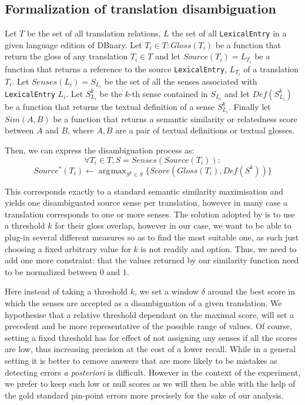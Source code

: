 \documentclass[10pt,a4paper,twoside]{article}
\DeclareMathOperator*{\argmax}{arg\!\max}
\begin{document}
\subsection{Formalization of translation disambiguation}
Let \(T\) be the set of all translation relations, \(L\) the set of all \verb|LexicalEntry| in a given language edition of DBnary. Let \(T_i\in T: Gloss(T_i)\) be a function that return the gloss of any translation \(T_i\in T\) and let \(Source(T_i)=L_{T_i}\) be a function that returns a reference to the source \verb|LexicalEntry|, \(L_{T_i}\) of a translation \(T_i\). Let \(Senses(L_i)=S_{L_i}\) be the set of all the senses associated with \verb|LexicalEntry| \(L_i\). Let \(S_{L_i}^k\) be the \(k\)-th sense contained in \(S_{L_i}\) and let \(Def(S_{L_i}^k)\) be a function that returns the textual definition of a sense \(S_{L_i}^k\). Finally let \(Sim(A,B)\) be a function that returns a semantic similarity or relatedness score between \(A\) and \(B\), where \(A,B\) are a pair of textual definitions or textual glosses. 

Then, we can express the disambiguation process as:
\[
\forall T_i \in T, S=Senses(Source(T_i)): 
\]
\[
Source^*(T_i) \leftarrow  \argmax_{S^k\in S} \{Score(Gloss(T_i),Def(S^k))\}
\]

This corresponds exactly to a standard semantic similarity maximisation and yields one disambiguated source sense per translation, however in many case a translation corresponds to one or more senses. The solution adopted by \cite{MeyerGurevych:oup2012} is to use a threshold \(k\) for their gloss overlap, however in our case, we want to be able to plug-in several different measures so as to find the most suitable one, as such just choosing a fixed arbitrary value for \(k\) is not readily and option. Thus, we need to add one more constraint: that the values returned by our similarity function need to be normalized between \(0 \mbox{ and  } 1\).

Here instead of taking a threshold \(k\), we set a window \(\delta\) around the best score in which the senses are accepted as a disambiguation of a given translation. We hypothesise that a relative threshold dependant on the maximal score, will set a precedent and be more representative of the possible range of values. Of course, setting a fixed threshold has for effect of not assigning any senses if all the scores are low, thus increasing precision at the cost of a lower recall. While in a general setting it is better to remove answers that are more likely to be mistakes as detecting errors \emph{a posteriori} is difficult. However in the context of the experiment, we prefer to keep such low or null scores as we will then be able with the help of the gold standard pin-point errors more precisely for the sake of our analysis.
\end{document}
